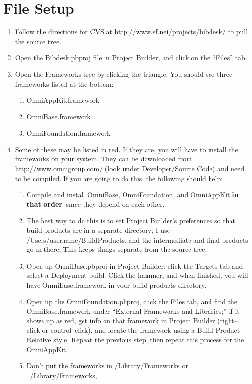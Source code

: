 \documentclass[11pt]{article}
\begin{document}
\section{File Setup}
\begin{enumerate}
\item Follow the directions for CVS at http://www.sf.net/projects/bibdesk/ to pull the source tree.
\item Open the Bibdesk.pbproj file in Project Builder, and click on the ``Files'' tab.
\item Open the Frameworks tree by clicking the triangle.  You should see three frameworks listed at
the bottom:
  \begin{enumerate}
  \item OmniAppKit.framework
  \item OmniBase.framework
  \item OmniFoundation.framework
  \end{enumerate}
\item Some of these may be listed in red.  If they are, you will have to install the frameworks on
your system.  They can be downloaded from http://www.omnigroup.com/ (look under Developer/Source
Code) and need to be compiled.  If you are going to do this, the following should help:
  \begin{enumerate}
  \item Compile and install OmniBase, OmniFoundation, and OmniAppKit \textbf{in that order}, since
they depend on each other.
  \item The best way to do this is to set Project Builder's preferences so that build products are in
a separate directory; I use /Users/username/BuildProducts, and the intermediate and final products
go in there.  This keeps things separate from the source tree.
  \item Open up OmniBase.pbproj in Project Builder, click the Targets tab and select a Deployment
build.  Click the hammer, and when finished, you will have OmniBase.framework in your build
products directory. 
  \item Open up the OmniFoundation.pbproj, click the Files tab, and find the OmniBase.framework
under ``External Frameworks and Libraries;'' if it shows up as red, get info on that framework
in Project Builder (right--click or control--click), and locate the framework using a Build
Product Relative style.  Repeat the previous step, then repeat this process for the OmniAppKit.
  \item Don't put the frameworks in /Library/Frameworks or ~/Library/Frameworks,

\end{enumerate}
\end{enumerate}
\end{document}
